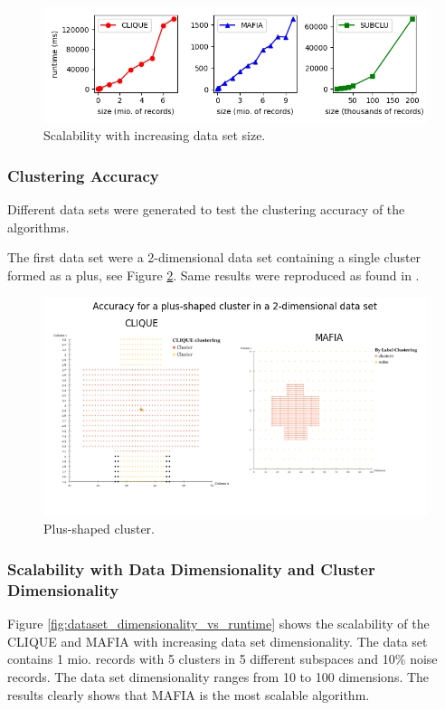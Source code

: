 \begin{figure}
    \centering
    \includegraphics[scale=0.6]{figures/dataset_size_vs_runtime.png}
    \caption{Scalability with increasing data set size.}
    \label{fig:dataset_size_vs_runtime}
\end{figure}

\subsubsection{Clustering Accuracy}
Different data sets were generated to test the clustering accuracy of the algorithms.

The first data set were a 2-dimensional data set containing a single cluster formed as a plus, see Figure \ref{fig:accuracy_plus}. Same results were reproduced as found in \cite{mafia}. 

\begin{figure}
    \centering
    \includegraphics[scale=0.6]{figures/accuracy_plus.png}
    \caption{Plus-shaped cluster.}
    \label{fig:accuracy_plus}
\end{figure}

\subsubsection{Scalability with Data Dimensionality and Cluster Dimensionality}
Figure \ref{fig:dataset_dimensionality_vs_runtime} shows the scalability of the CLIQUE and MAFIA with increasing data set dimensionality. The data set contains 1 mio. records with 5 clusters in 5 different subspaces and 10\% noise records. The data set dimensionality ranges from 10 to 100 dimensions. The results clearly shows that MAFIA is the most scalable algorithm.

